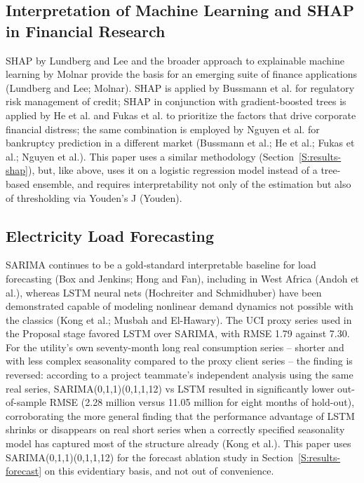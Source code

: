 \documentclass[final,1p,times]{elsarticle}
\begin{document}
\subsection{Interpretation of Machine Learning and SHAP in Financial Research}

SHAP by Lundberg and Lee and the broader approach to explainable machine learning by Molnar provide the basis for an emerging suite of finance applications (Lundberg and Lee; Molnar). SHAP is applied by Bussmann et al. for regulatory risk management of credit; SHAP in conjunction with gradient-boosted trees is applied by He et al. and Fukas et al. to prioritize the factors that drive corporate financial distress; the same combination is employed by Nguyen et al. for bankruptcy prediction in a different market (Bussmann et al.; He et al.; Fukas et al.; Nguyen et al.). This paper uses a similar methodology (Section~\ref{S:results-shap}), but, like above, uses it on a logistic regression model instead of a tree-based ensemble, and requires interpretability not only of the estimation but also of thresholding via Youden’s J (Youden).
\subsection{Electricity Load Forecasting}

SARIMA continues to be a gold-standard interpretable baseline for load forecasting (Box and Jenkins; Hong and Fan), including in West Africa (Andoh et al.), whereas LSTM neural nets (Hochreiter and Schmidhuber) have been demonstrated capable of modeling nonlinear demand dynamics not possible with the classics (Kong et al.; Musbah and El-Hawary). The UCI proxy series used in the Proposal stage favored LSTM over SARIMA, with RMSE 1.79 against 7.30. For the utility's own seventy-month long real consumption series -- shorter and with less complex seasonality compared to the proxy client series -- the finding is reversed: according to a project teammate's independent analysis using the same real series, SARIMA(0,1,1)(0,1,1,12) vs LSTM resulted in significantly lower out-of-sample RMSE (2.28 million versus 11.05 million for eight months of hold-out), corroborating the more general finding that the performance advantage of LSTM shrinks or disappears on real short series when a correctly specified seasonality model has captured most of the structure already (Kong et al.). This paper uses SARIMA(0,1,1)(0,1,1,12) for the forecast ablation study in Section~\ref{S:results-forecast} on this evidentiary basis, and not out of convenience.
\end{document}
